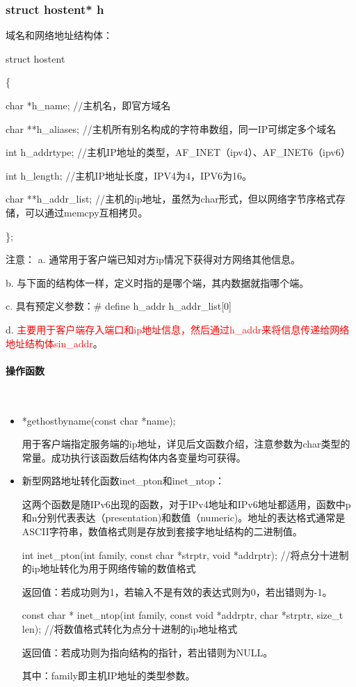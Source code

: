 \documentclass[UTF8]{article}%
\begin{document}
\subsubsection{struct hostent* h}

域名和网络地址结构体：

struct hostent

\{

\qquad    char *h\_name;  //主机名，即官方域名
    
\qquad    char **h\_aliases;  //主机所有别名构成的字符串数组，同一IP可绑定多个域名

\qquad    int h\_addrtype; //主机IP地址的类型，AF\_INET（ipv4）、AF\_INET6（ipv6）

\qquad    int h\_length;  //主机IP地址长度，IPV4为4，IPV6为16。

\qquad    char **h\_addr\_list;  //主机的ip地址，虽然为char形式，但以网络字节序格式存储，可以通过memcpy互相拷贝。

\};

注意：
a. 通常用于客户端已知对方ip情况下获得对方网络其他信息。

b. 与下面的结构体一样，定义时指的是哪个端，其内数据就指哪个端。

c. 具有预定义参数：\# define h\_addr  h\_addr\_list[0]

d. \textcolor{red}{主要用于客户端存入端口和ip地址信息，然后通过h\_addr来将信息传递给网络地址结构体sin\_addr}。

\paragraph{操作函数}~{}


\begin{itemize}
    \item *gethostbyname(const char *name);
    
    用于客户端指定服务端的ip地址，详见后文函数介绍，注意参数为char类型的常量。成功执行该函数后结构体内各变量均可获得。

    \item 新型网路地址转化函数inet\_pton和inet\_ntop：
    
    这两个函数是随IPv6出现的函数，对于IPv4地址和IPv6地址都适用，函数中p和n分别代表表达（presentation)和数值（numeric)。地址的表达格式通常是ASCII字符串，数值格式则是存放到套接字地址结构的二进制值。

    int inet\_pton(int family, const char *strptr, void *addrptr);     //将点分十进制的ip地址转化为用于网络传输的数值格式
        
    返回值：若成功则为1，若输入不是有效的表达式则为0，若出错则为-1。
 
    const char * inet\_ntop(int family, const void *addrptr, char *strptr, size\_t len);     //将数值格式转化为点分十进制的ip地址格式

    返回值：若成功则为指向结构的指针，若出错则为NULL。

    其中：family即主机IP地址的类型参数。
    
\end{itemize}
\end{document}
